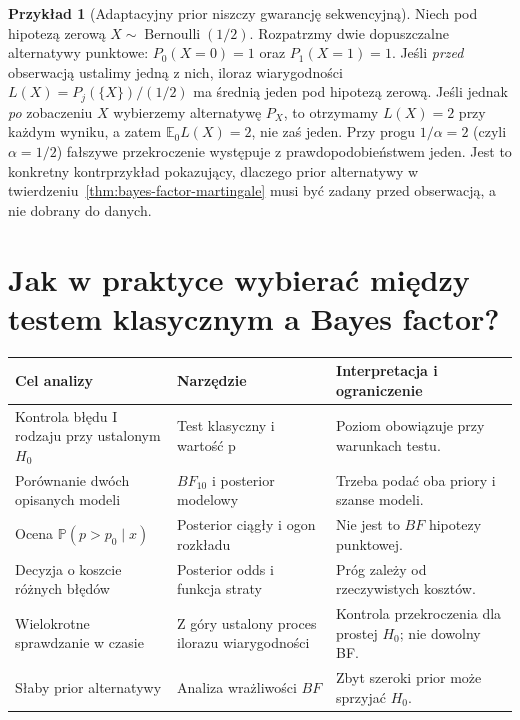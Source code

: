 \documentclass[11pt,a4paper,oneside]{report}
\numberwithin{equation}{chapter}
\theoremstyle{plain}
\theoremstyle{definition}
\newtheorem{przyklad}{Przykład}[chapter]
\theoremstyle{remark}
\newcommand{\Prob}{\mathbb P}
\newcommand{\E}{\mathbb E}
\begin{document}
\begin{przyklad}[Adaptacyjny prior niszczy gwarancję sekwencyjną]
\label{ex:adapt-bf-fails}
Niech pod hipotezą zerową $X\sim\operatorname{Bernoulli}(1/2)$.
Rozpatrzmy dwie dopuszczalne alternatywy punktowe:
$P_0(X=0)=1$ oraz $P_1(X=1)=1$. Jeśli \emph{przed}
obserwacją ustalimy jedną z nich, iloraz wiarygodności
$L(X)=P_j(\{X\})/(1/2)$ ma średnią jeden pod hipotezą
zerową. Jeśli jednak \emph{po} zobaczeniu $X$ wybierzemy
alternatywę $P_X$, to otrzymamy $L(X)=2$ przy każdym wyniku,
a zatem $\E_0 L(X)=2$, nie zaś jeden.
Przy progu $1/\alpha=2$ (czyli $\alpha=1/2$) fałszywe
przekroczenie występuje z prawdopodobieństwem jeden.
Jest to konkretny kontrprzykład pokazujący, dlaczego prior
alternatywy w twierdzeniu~\ref{thm:bayes-factor-martingale}
musi być zadany przed obserwacją, a nie dobrany do danych.
\end{przyklad}

\section{Jak w praktyce wybierać między testem klasycznym a Bayes factor?}
\begin{center}\small
\begin{tabular}{>{\raggedright\arraybackslash}p{}>{\raggedright\arraybackslash}p{}>{\raggedright\arraybackslash}p{}}
\toprule
\textbf{Cel analizy} & \textbf{Narzędzie} & \textbf{Interpretacja i ograniczenie}\\
\midrule
Kontrola błędu I rodzaju przy ustalonym $H_0$ & Test klasyczny i wartość p & Poziom obowiązuje przy warunkach testu.\\
Porównanie dwóch opisanych modeli & $BF_{10}$ i posterior modelowy & Trzeba podać oba priory i szanse modeli.\\
Ocena $\Prob(p>p_0\mid x)$ & Posterior ciągły i ogon rozkładu & Nie jest to $BF$ hipotezy punktowej.\\
Decyzja o koszcie różnych błędów & Posterior odds i funkcja straty & Próg zależy od rzeczywistych kosztów.\\
Wielokrotne sprawdzanie w czasie & Z góry ustalony proces ilorazu wiarygodności & Kontrola przekroczenia dla prostej $H_0$; nie dowolny BF.\\
Słaby prior alternatywy & Analiza wrażliwości $BF$ & Zbyt szeroki prior może sprzyjać $H_0$.\\
\bottomrule
\end{tabular}
\end{center}
\end{document}
